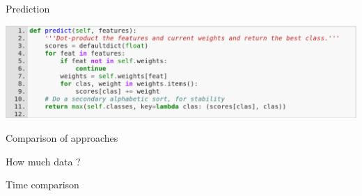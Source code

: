 \documentclass{beamer}
\begin{document}
\begin{frame}{Prediction}

\begin{center}
\includegraphics[width=\textwidth]{images/perceptron-predict.png}
\end{center}

\end{frame}


\begin{frame}{Comparison of approaches}




\end{frame}




\begin{frame}{How much data ?}

\end{frame}

\begin{frame}{Time comparison}




\end{frame}

\end{document}
